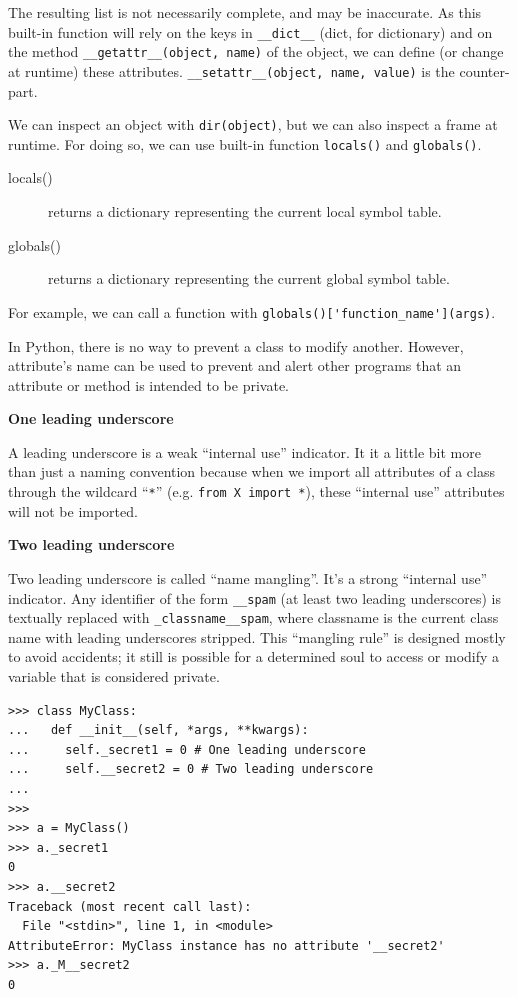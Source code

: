 \documentclass[a4paper,10pt]{article}
\begin{document}
The resulting list is not necessarily complete, and may be inaccurate. As this built-in function will rely on the keys in \lstinline|__dict__| (dict, for dictionary) and on the method \lstinline|__getattr__(object, name)| of the object, we can define (or change at runtime) these attributes. \lstinline|__setattr__(object, name, value)| is the counter-part.

We can inspect an object with \lstinline|dir(object)|, but we can also inspect a frame at runtime. For doing so, we can use built-in function \lstinline|locals()| and \lstinline|globals()|.

\begin{description}
\item[locals()] returns a dictionary representing the current local symbol table.
\item[globals()] returns a dictionary representing the current global symbol table.
\end{description}

For example, we can call a function with \lstinline|globals()['function_name'](args)|.

In Python, there is no way to prevent a class to modify another. However, attribute's name can be used to prevent and alert other programs that an attribute or method is intended to be private.

\textbf{One leading underscore}

A leading underscore is a weak ``internal use'' indicator. It it a little bit more than just a naming convention because when we import all attributes of a class through the wildcard ``\lstinline|*|'' (e.g. \lstinline|from X import *|), these ``internal use'' attributes will not be imported.

\textbf{Two leading underscore}

Two leading underscore is called ``name mangling''. It’s a strong “internal use” indicator. Any identifier of the form \lstinline|__spam| (at least two leading underscores) is textually replaced with \lstinline|_classname__spam|, where classname is the current class name with leading underscores stripped. This “mangling rule” is designed mostly to avoid accidents; it still is possible for a determined soul to access or modify a variable that is considered private.

\begin{lstlisting}
>>> class MyClass:
...   def __init__(self, *args, **kwargs):
...     self._secret1 = 0 # One leading underscore
...     self.__secret2 = 0 # Two leading underscore
...
>>>
>>> a = MyClass()
>>> a._secret1
0
>>> a.__secret2
Traceback (most recent call last):
  File "<stdin>", line 1, in <module>
AttributeError: MyClass instance has no attribute '__secret2'
>>> a._M__secret2
0
\end{lstlisting}
\end{document}
